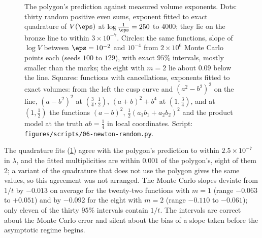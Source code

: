 \begin{refsection}
\begin{figure}[t]
\centering
{}
\caption{The polygon's prediction against measured volume exponents. Dots: thirty random positive even sums, exponent fitted to exact quadrature of $V(\eps)$ at $\log\frac1\eps=250$ to $4000$; they lie on the bronze line to within $3\times10^{-7}$. Circles: the same functions, slope of $\log V$ between $\eps=10^{-2}$ and $10^{-4}$ from $2\times10^6$ Monte Carlo points each (seeds $100$ to $129$), with exact $95\%$ intervals, mostly smaller than the marks; the eight with $m=2$ lie about $0.09$ below the line. Squares: functions with cancellations, exponents fitted to exact volumes: from the left the cusp curve and $(a^2-b^2)^2$ on the line, $(a-b^2)^2$ at $(\frac34,\frac12)$, $(a+b)^2+b^4$ at $(1,\frac34)$, and at $(1,\frac12)$ the functions $(a-b)^2$, $\frac12(a_1b_1+a_2b_2)^2$ and the product model at the truth $ab=\frac14$ in local coordinates. Script: \texttt{figures/scripts/06-newton-random.py}.}\label{fig:newton:random}
\end{figure}

The quadrature fits (\cref{fig:newton:random}) agree with the polygon's prediction to within $2.5\times10^{-7}$ in $\lambda$, and the fitted multiplicities are within $0.001$ of the polygon's, eight of them $2$; a variant of the quadrature that does not use the polygon gives the same values, so this agreement was not arranged. The Monte Carlo slopes deviate from $1/t$ by $-0.013$ on average for the twenty-two functions with $m=1$ (range $-0.063$ to $+0.051$) and by $-0.092$ for the eight with $m=2$ (range $-0.110$ to $-0.061$); only eleven of the thirty $95\%$ intervals contain $1/t$. The intervals are correct about the Monte Carlo error and silent about the bias of a slope taken before the asymptotic regime begins.


\end{refsection}
